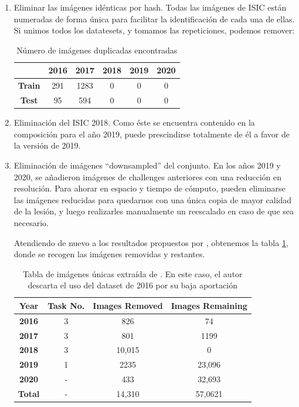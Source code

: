 \begin{enumerate}
	
	
	\item Eliminar las imágenes idénticas por hash. Todas las imágenes de ISIC están numeradas de forma única para facilitar la identificación de cada una de ellas. Si unimos todos los datatesets, y tomamos las repeticiones, podemos remover:
	
	\begin{table}[H]
		\centering
		\begin{tabular}{|c|c|c|c|c|c|}
			\hline
			\textbf{} & \textbf{2016} & \textbf{2017} & \textbf{2018} & \textbf{2019} & \textbf{2020} \\ \hline
			\textbf{Train} & 291 & 1283 & 0 & 0 & 0 \\ \hline
			\textbf{Test} & 95 & 594 & 0 & 0 & 0 \\ \hline
		\end{tabular}
		\caption{Número de imágenes duplicadas encontradas \cite{CASSIDY2022102305}}
	\end{table}
	
	
	\item 	Eliminación del ISIC 2018. Como éste se encuentra contenido en la composición para el año 2019, puede prescindirse totalmente de él a favor de la versión de 2019.
	\item 	Eliminación de imágenes “downsampled” del conjunto. En los años 2019 y 2020, se añadieron imágenes de challenges anteriores con una reducción en resolución. Para ahorar en espacio y tiempo de cómputo, pueden eliminarse las imágenes reducidas para quedarnos con una única copia de mayor calidad de la lesión, y luego realizarles manualmente un reescalado en caso de que sea necesario.
	
	Atendiendo de nuevo a los resultados propuestos por  \cite{CASSIDY2022102305}, obtenemos la tabla \ref{tab:isicresum}, donde se recogen las imágenes removidas y restantes.
	
	\begin{table}[H]
		\centering
		\begin{tabular}{|c|c|c|c|}
			\hline
			\textbf{Year} & \textbf{Task No.} & \textbf{Images Removed} & \textbf{Images Remaining} \\ \hline
			\textbf{2016} & 3 & 826 & 74 \\ \hline
			\textbf{2017} & 3 & 801 & 1199 \\ \hline
			\textbf{2018} & 3 & 10,015 & 0 \\ \hline
			\textbf{2019} & 1 & 2235 & 23,096 \\ \hline
			\textbf{2020} & - & 433 & 32,693 \\ \hline
			\textbf{Total} & - & 14,310 & 57,0621 \\ \hline
		\end{tabular}
		\caption{Tabla de imágenes únicas extraída de \cite{CASSIDY2022102305}. En este caso, el autor descarta el uso del dataset de 2016 por su baja aportación}
		\label{tab:isicresum}
	\end{table}
	
\end{enumerate}


